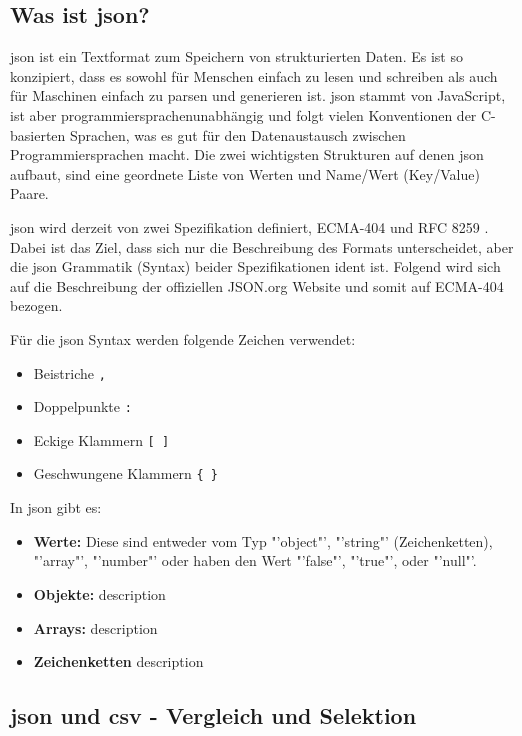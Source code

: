 \subsection{Was ist \acs{json}?}
\acf{json} ist ein Textformat zum Speichern von strukturierten Daten. Es ist so konzipiert, dass es sowohl für Menschen einfach zu lesen und schreiben als auch für Maschinen einfach zu parsen und generieren ist. \acs{json} stammt von JavaScript, ist aber programmiersprachenunabhängig und folgt vielen Konventionen der C-basierten Sprachen, was es gut für den Datenaustausch zwischen Programmiersprachen macht. Die zwei wichtigsten Strukturen auf denen \acs{json} aufbaut, sind eine geordnete Liste von Werten und Name/Wert (Key/Value) Paare. \cite{json_org:o.J.} 

\acs{json} wird derzeit von zwei Spezifikation definiert, ECMA-404 \cite{ECMA:2017} und RFC 8259 \cite{Bray:2017}. Dabei ist das Ziel, dass sich nur die Beschreibung des Formats unterscheidet, aber die \acs{json} Grammatik (Syntax) beider Spezifikationen ident ist. Folgend wird sich auf die Beschreibung der offiziellen JSON.org Website \cite{json_org:o.J.} und somit auf ECMA-404 \cite{ECMA:2017} bezogen.

Für die \acs{json} Syntax werden folgende Zeichen verwendet:
\begin{itemize}
 \item Beistriche \lstinline|,|
 \item Doppelpunkte \lstinline|:|
 \item Eckige Klammern \lstinline|[ ]|
  \item Geschwungene Klammern \lstinline|{ }|
\end{itemize}


In \acs{json} gibt es:
\begin{itemize}
	\item \textbf{Werte:} Diese sind entweder vom Typ "'object"', "'string"' (Zeichenketten), "'array"', "'number"' oder haben den Wert "'false"', "'true"', oder "'null"'.
		
	\item \textbf{Objekte:} description
	
	\item \textbf{Arrays:} description
	
	\item \textbf{Zeichenketten} description
\end{itemize}

\subsection{\acs{json} und \acs{csv} - Vergleich und Selektion}
\cite{SQLizer:2017}
